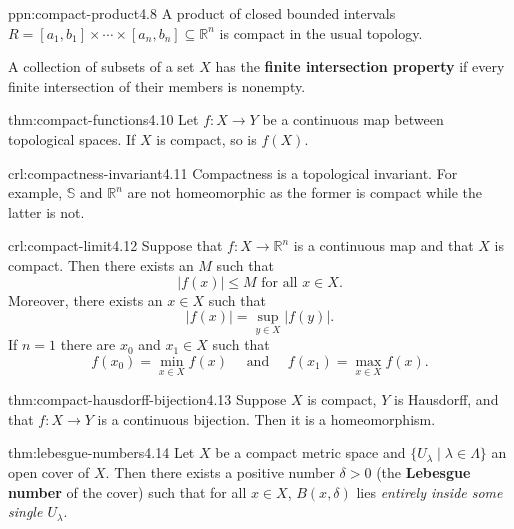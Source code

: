 \documentclass[landscape, 8pt]{extarticle}
\begin{document}
\begin{multicols}{3}
\begin{ppn}{ppn:compact-product}{4.8}
    A product of closed bounded intervals $R = [a_{1},b_{1}] \times \cdots \times [a_{n}, b_{n}] \subseteq \mathbb{R}^{n}$ is compact in the usual topology.

    A collection of subsets of a set $X$ has the \textbf{finite intersection property} if every finite intersection of their members is nonempty.
\end{ppn}

\begin{thm}{thm:compact-functions}{4.10}
    Let $f : X \to Y$ be a continuous map between topological spaces. If $X$ is compact, so is $f(X)$.
\end{thm}

\begin{crl}[]{crl:compactness-invariant}{4.11}
    Compactness is a topological invariant. For example, $\mathbb{S}$ and $\mathbb{R}^{n}$ are not homeomorphic as the former is compact while the latter is not.
\end{crl}

\begin{crl}{crl:compact-limit}{4.12}
    Suppose that $f : X \to \mathbb{R}^{n}$ is a continuous map and that $X$ is compact. Then there exists an $M$ such that
    \[\lvert f(x) \rvert \le M \text{ for all } x\in X.\]
	Moreover, there exists an $x\in X$ such that
	\[\lvert f(x) \rvert = \sup_{y\in X} \lvert f(y) \rvert.\]
	If $n = 1$ there are $x_{0}$ and $x_{1}\in X$ such that
	\[f(x_{0}) = \min_{x\in X} f(x) \quad \text{ and } \quad f(x_{1}) = \max_{x\in X} f(x).\]
\end{crl}

\begin{thm}{thm:compact-hausdorff-bijection}{4.13}
	Suppose $X$ is compact, $Y$ is Hausdorff, and that $f : X \to Y$ is a continuous bijection. Then it is a homeomorphism.
\end{thm}

\begin{thm}{thm:lebesgue-numbers}{4.14}
	Let $X$ be a compact metric space and $\{U_{\lambda} \mid \lambda\in\Lambda\}$ an open cover of $X$. Then there exists a positive number $\delta>0$ (the \textbf{Lebesgue number} of the cover) such that for all $x\in X$, $B(x, \delta)$ lies \textit{entirely inside some single $U_{\lambda}$}.
\end{thm}


\end{multicols}
\end{document}
